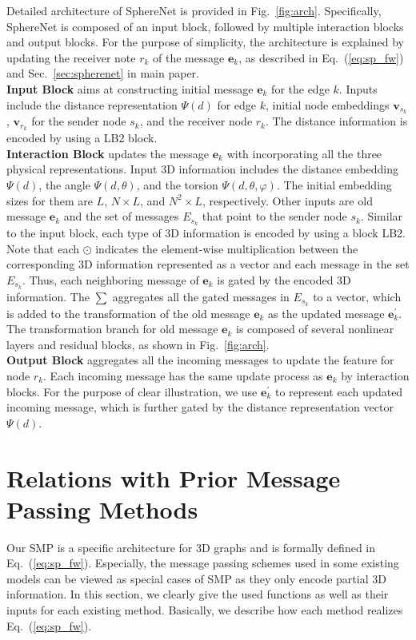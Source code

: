\documentclass{article}
\begin{document}
Detailed architecture of SphereNet is provided in Fig.~\ref{fig:arch}.
Specifically, SphereNet is composed of an input block, followed by multiple interaction blocks and output blocks.
For the purpose of simplicity, the architecture is explained by
updating the receiver note $r_k$ of the message $\mathbf{e}_k$,
as described in Eq.~(\ref{eq:sp_fw}) and Sec.~\ref{sec:spherenet}
in main paper.\\
\textbf{Input Block} aims at constructing initial message $\mathbf{e}_k$
for the edge $k$.
Inputs include the distance representation $\Psi(d)$ for edge $k$, initial node embeddings
$\mathbf{v}_{s_k}$, $\mathbf{v}_{r_k}$
for the sender node $s_k$,
and the receiver node $r_k$.
The distance information is encoded by using a LB2 block.\\
\textbf{Interaction Block} updates the message $\mathbf{e}_k$
with incorporating all the three physical representations.
Input 3D information includes the distance embedding $\Psi(d)$,
the angle $\Psi(d, \theta)$,
and the torsion $\Psi(d, \theta, \varphi)$.
The initial embedding sizes for them are $L$,
$N\times L$,
and $N^2\times L$, respectively.
Other inputs are old message $\mathbf{e}_k$ and the set of messages $E_{s_k}$ that
point to the sender node $s_k$.
Similar to the input block,
each type of 3D information is encoded by using a block LB2.
Note that each $\odot$ indicates
the element-wise multiplication between the corresponding 
3D information represented as a vector and each message in the set $E_{s_k}$.
Thus, each neighboring message of $\mathbf{e}_k$ is gated by the encoded 3D information.
The $\sum$ aggregates all the gated messages in $E_{s_k}$ to a vector,
which is added to the transformation of the old message $\mathbf{e}_k$
as the updated message $\mathbf{e}^\prime_k$.
The transformation branch for old message $\mathbf{e}_k$
is composed of several nonlinear layers and residual blocks,
as shown in Fig.~\ref{fig:arch}.\\
\textbf{Output Block} aggregates all the incoming messages to
update the feature for node $r_k$.
Each incoming message has the same update process as $\mathbf{e}_k$
by interaction blocks.
For the purpose of clear illustration, we use $\mathbf{e}^\prime_k$ to represent each updated incoming message, which is further gated by the distance representation vector $\Psi(d)$.



\section{Relations with Prior Message Passing Methods} \label{sec:supp_C}
Our SMP is a specific architecture for 3D graphs
and is formally defined in Eq.~(\ref{eq:sp_fw}).
Especially, the message passing schemes used in some existing models can be viewed as special cases of SMP as they only encode
partial 3D information.
In this section, we clearly give the used functions as well as their inputs for each existing method.
Basically,
we describe how each method realizes Eq.~(\ref{eq:sp_fw}).
\end{document}
